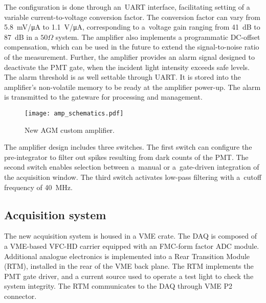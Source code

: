 The configuration is done through an~UART interface, facilitating
setting of a variable current-to-voltage conversion factor. The conversion factor can vary from
\SI{5.8}{mV/\micro A} to \SI{1.1}{V/\micro A}, corresponding to a~voltage gain ranging from \SI{41}{dB} to \SI{87}{dB} in a $50\Omega$ system. The amplifier also implements a programmatic DC-offset compensation, which can be used in the future to extend the signal-to-noise ratio of the measurement. Further, the amplifier provides an alarm signal designed to
deactivate the PMT gate, when the incident light intensity exceeds safe levels. The alarm threshold is as well settable through UART. It is stored into the amplifier's non-volatile memory to be ready at the amplifier power-up. The alarm is transmitted to the gateware for processing and management.

\begin{figure}[!tbh]
    \centering
    \texttt{[image: amp\_schematics.pdf]}
    \caption{New AGM custom amplifier.}
    \label{fig:amp_schematics}
\end{figure}

The amplifier design includes three switches. The first switch can configure
the pre-integrator to filter out spikes resulting from dark counts of the PMT.
The second switch enables selection between a~manual or a~gate-driven integration
of the acquisition window. The third switch activates low-pass filtering with a~cutoff frequency of \SI{40}{MHz}.

\subsection{Acquisition system}
The new acquisition system is housed in a VME crate. The DAQ is composed of a VME-based VFC-HD carrier equipped with an FMC-form factor ADC module. Additional analogue electronics is implemented into a  Rear Transition Module (RTM), installed in the rear of the VME back plane. The RTM implements the PMT gate driver, and a current source used to operate a test light to check the system integrity. The RTM communicates to the DAQ through VME P2 connector. 

